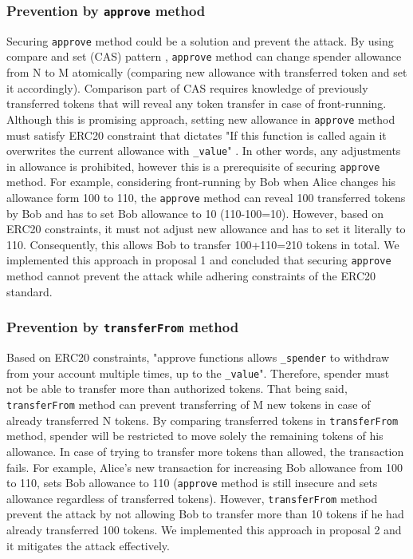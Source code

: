 	
\subsubsection*{Prevention by \texttt{approve} method} Securing \texttt{approve} method could be a solution and prevent the attack. By using compare and set (CAS) pattern \cite{Ref06}, \texttt{approve} method can change spender allowance from N to M atomically (\ie comparing new allowance with transferred token and set it accordingly). Comparison part of CAS requires knowledge of previously transferred tokens that will reveal any token transfer in case of front-running. Although this is promising approach,  setting new allowance in \texttt{approve} method must satisfy ERC20 constraint that dictates "If this function is called again it overwrites the current allowance with \texttt{\_value}" \cite{Ref08}. In other words, any adjustments in allowance is prohibited, however this is a prerequisite of securing \texttt{approve} method. 
For example, considering front-running by Bob when Alice changes his allowance form 100 to 110, the \texttt{approve} method can reveal 100 transferred tokens by Bob and has to set Bob allowance to 10 (110-100=10). However, based on ERC20 constraints, it must not adjust new allowance and has to set it literally to 110. Consequently, this allows Bob to transfer 100+110=210 tokens in total. We implemented this approach in proposal 1 and concluded that securing \texttt{approve} method cannot prevent the attack while adhering constraints of the ERC20 standard.
	
\subsubsection*{Prevention by \texttt{transferFrom} method} Based on ERC20 constraints, "approve functions allows \texttt{\_spender} to withdraw from your account multiple times, up to the \texttt{\_value}". Therefore, spender must not be able to transfer more than authorized tokens. That being said, \texttt{transferFrom} method can prevent transferring of M new tokens in case of already transferred N tokens. By comparing transferred tokens in \texttt{transferFrom} method, spender will be restricted to move solely the remaining tokens of his allowance. In case of trying to transfer more tokens than allowed, the transaction fails. For example, Alice's new transaction for increasing Bob allowance from 100 to 110, sets Bob allowance to 110 (\texttt{approve} method is still insecure and sets allowance regardless of transferred tokens). However, \texttt{transferFrom} method prevent the attack by not allowing Bob to transfer more than 10 tokens if he had already transferred 100 tokens. We implemented this approach in proposal 2 and it mitigates the attack effectively.

